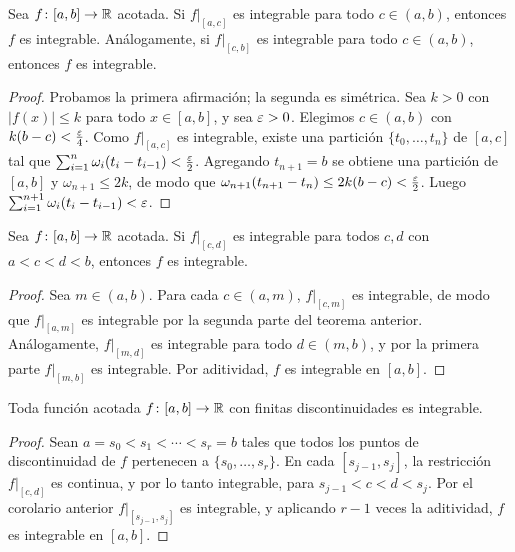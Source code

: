 \begin{theorem}
  Sea \(f\colon [a, b] \to \mathbb{R}\) acotada. Si \(f|_{[a, c]}\) es integrable para todo \(c \in (a, b)\), entonces \(f\) es integrable. Análogamente, si \(f|_{[c, b]}\) es integrable para todo \(c \in (a, b)\), entonces \(f\) es integrable.
\end{theorem}

\begin{proof}
  Probamos la primera afirmación; la segunda es simétrica. Sea \(k > 0\) con \(|f(x)| \leq k\) para todo \(x \in [a, b]\), y sea \(\varepsilon > 0\). Elegimos \(c \in (a, b)\) con \(k (b - c) < \frac{\varepsilon}{4}\). Como \(f|_{[a, c]}\) es integrable, existe una partición \(\{ t_0, \dots, t_n \}\) de \([a, c]\) tal que \(\sum_{i=1}^{n} \omega_i (t_i - t_{i-1}) < \frac{\varepsilon}{2}\). Agregando \(t_{n+1} = b\) se obtiene una partición de \([a, b]\) y \(\omega_{n+1} \leq 2k\), de modo que \(\omega_{n+1} (t_{n+1} - t_n) \leq 2k (b - c) < \frac{\varepsilon}{2}\). Luego \(\sum_{i=1}^{n+1} \omega_i (t_i - t_{i-1}) < \varepsilon\).
\end{proof}

\begin{corollary}
  Sea \(f\colon [a, b] \to \mathbb{R}\) acotada. Si \(f|_{[c, d]}\) es integrable para todos \(c, d\) con \(a < c < d < b\), entonces \(f\) es integrable.
\end{corollary}

\begin{proof}
  Sea \(m \in (a, b)\). Para cada \(c \in (a, m)\), \(f|_{[c, m]}\) es integrable, de modo que \(f|_{[a, m]}\) es integrable por la segunda parte del teorema anterior. Análogamente, \(f|_{[m, d]}\) es integrable para todo \(d \in (m, b)\), y por la primera parte \(f|_{[m, b]}\) es integrable. Por aditividad, \(f\) es integrable en \([a, b]\).
\end{proof}

\begin{corollary}
  Toda función acotada \(f\colon [a, b] \to \mathbb{R}\) con finitas discontinuidades es integrable.
\end{corollary}

\begin{proof}
  Sean \(a = s_0 < s_1 < \cdots < s_r = b\) tales que todos los puntos de discontinuidad de \(f\) pertenecen a \(\{ s_0, \dots, s_r \}\). En cada \([s_{j-1}, s_j]\), la restricción \(f|_{[c, d]}\) es continua, y por lo tanto integrable, para \(s_{j-1} < c < d < s_j\). Por el corolario anterior \(f|_{[s_{j-1}, s_j]}\) es integrable, y aplicando \(r - 1\) veces la aditividad, \(f\) es integrable en \([a, b]\).
\end{proof}

